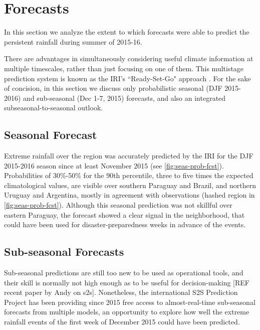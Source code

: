 \documentclass[twocol]{ametsoc}
\begin{document}

\section{Forecasts} \label{sec:fcsts}

In this section we analyze the extent to which forecasts were able to predict the persistent rainfall during summer of 2015-16.

There are advantages in simultaneously considering useful climate information at multiple timescales, rather than just focusing on one of them.
This multistage prediction system is known as the IRI's ``Ready-Set-Go" approach \citep{Goddard:2014kf,Munoz2016}.
For the sake of concision, in this section we discuss only probabilistic seasonal (DJF 2015-2016) and sub-seasonal (Dec 1-7, 2015) forecasts, and also an integrated subseasonal-to-seasonal outlook.

\subsection{Seasonal Forecast}

Extreme rainfall over the region was accurately predicted by the IRI for the DJF 2015-2016 season since at least November 2015 (see \cref{fig:seas-prob-fcst}). Probabilities of 30\%-50\% for the 90th percentile, three to five times the expected climatological values, are visible over southern Paraguay and Brazil, and northern Uruguay and Argentina, mostly in agreement with observations (hashed region in \cref{fig:seas-prob-fcst}).
Although this seasonal prediction was not skillful over eastern Paraguay, the forecast  showed a clear signal in the neighborhood, that could have been used for disaster-preparedness weeks in advance of the events.

\subsection{Sub-seasonal Forecasts}
Sub-seasonal predictions are still too new to be used as operational tools, and their skill is normally not high enough as to be useful for decision-making [REF recent paper by Andy on s2s]. Nonetheless, the international S2S Prediction Project \citep{Vitart2016} has been providing since 2015 free access to almost-real-time sub-seasonal forecasts from multiple models, an opportunity to explore how well the extreme rainfall events of the first week of December 2015 could have been predicted.
\end{document}
